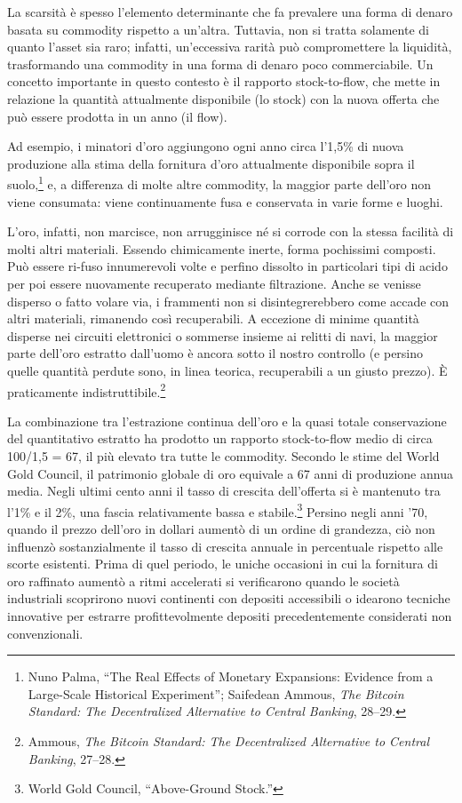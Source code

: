 \documentclass[
  a5paper,
  smalldemyvopaper,10pt,twoside,onecolumn,openright,extrafontsizes,hidelinks]{memoir}
\begin{document}
La scarsità è spesso l'elemento determinante che fa prevalere una forma
di denaro basata su commodity rispetto a un'altra. Tuttavia, non si
tratta solamente di quanto l'asset sia raro; infatti, un'eccessiva
rarità può compromettere la liquidità, trasformando una commodity in una
forma di denaro poco commerciabile. Un concetto importante in questo
contesto è il rapporto stock-to-flow, che mette in relazione la quantità
attualmente disponibile (lo stock) con la nuova offerta che può essere
prodotta in un anno (il flow).

Ad esempio, i minatori d'oro aggiungono ogni anno circa l'1,5\% di nuova
produzione alla stima della fornitura d'oro attualmente disponibile
sopra il suolo,\footnote{Nuno Palma, ``The Real Effects of Monetary
  Expansions: Evidence from a Large-Scale Historical Experiment'';
  Saifedean Ammous, \emph{The Bitcoin Standard: The Decentralized
  Alternative to Central Banking}, 28--29.} e, a differenza di molte
altre commodity, la maggior parte dell'oro non viene consumata: viene
continuamente fusa e conservata in varie forme e luoghi.

L'oro, infatti, non marcisce, non arrugginisce né si corrode con la
stessa facilità di molti altri materiali. Essendo chimicamente inerte,
forma pochissimi composti. Può essere ri-fuso innumerevoli volte e
perfino dissolto in particolari tipi di acido per poi essere nuovamente
recuperato mediante filtrazione. Anche se venisse disperso o fatto
volare via, i frammenti non si disintegrerebbero come accade con altri
materiali, rimanendo così recuperabili. A eccezione di minime quantità
disperse nei circuiti elettronici o sommerse insieme ai relitti di navi,
la maggior parte dell'oro estratto dall'uomo è ancora sotto il nostro
controllo (e persino quelle quantità perdute sono, in linea teorica,
recuperabili a un giusto prezzo). È praticamente
indistruttibile.\footnote{Ammous, \emph{The Bitcoin Standard: The
  Decentralized Alternative to Central Banking}, 27--28.}

La combinazione tra l'estrazione continua dell'oro e la quasi totale
conservazione del quantitativo estratto ha prodotto un rapporto
stock-to-flow medio di circa 100/1,5 = 67, il più elevato tra tutte le
commodity. Secondo le stime del World Gold Council, il patrimonio
globale di oro equivale a 67 anni di produzione annua media. Negli
ultimi cento anni il tasso di crescita dell'offerta si è mantenuto tra
l'1\% e il 2\%, una fascia relativamente bassa e stabile.\footnote{World
  Gold Council, ``Above-Ground Stock.''} Persino negli anni '70, quando
il prezzo dell'oro in dollari aumentò di un ordine di grandezza, ciò non
influenzò sostanzialmente il tasso di crescita annuale in percentuale
rispetto alle scorte esistenti. Prima di quel periodo, le uniche
occasioni in cui la fornitura di oro raffinato aumentò a ritmi
accelerati si verificarono quando le società industriali scoprirono
nuovi continenti con depositi accessibili o idearono tecniche innovative
per estrarre profittevolmente depositi precedentemente considerati non
convenzionali.
\end{document}
